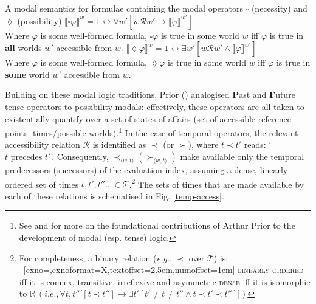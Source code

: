 \documentclass[11pt,dvipsnames]{report}
\providecommand{\denote}[2][]{\ensuremath{\llbracket{#2}\rrbracket^{#1}}}
\begin{document}
\pex A modal semantics for formulae containing the modal operators $ \square $ (necessity) and $ \lozenge $ (possibility)  
\a$ \denote[w]{\square\varphi} =1\leftrightarrow\forall w'[w\mathcal{R} w'\to\denote[w']{\varphi}] $\\
Where $ \varphi $ is some well-formed formula, $ \square\varphi $ is true in some world $ w $ iff $ \varphi $ is true in \textbf{all} worlds $ w' $ accessible from $ w $.
\a$  \denote[w]{\lozenge\varphi} =1\leftrightarrow\exists w'[w\mathcal{R} w'\wedge\denote[w']{\varphi}] $\\
Where $ \varphi $ is some well-formed formula, $ \lozenge\varphi $ is true in some world $ w $ iff $ \varphi $ is true in \textbf{some} world $ w' $ accessible from $ w $.
\xe


\noindent Building on these modal logic traditions, Prior (\citeyear{Prior1958,Prior1967,Prior1957}) analogised \textbf{P}ast and \textbf{F}uture tense operators to possibility modals: effectively, these operators are all taken to existentially quantify over a set of states-of-affairs (set of accessible reference points: times/possible worlds).\footnote{See \citet{Copeland2002,Copeland2020} and \citet{Markoska-Cubrinovska2016} for more on the foundational contributions of Arthur Prior to the development of modal (esp. tense) logic.} In the case of temporal operators, the relevant accessibility relation $ \mathcal R $ is identified as $ \prec $ (or $ \succ $), where $ t\prec t' $ reads: `$ t \text{ precedes }t' $'. Consequently, $ \prec_{\langle w,t\rangle} (\succ_{\langle w,t\rangle}) $ make available only the temporal predecessors (successors) of the evaluation index, assuming a dense, linearly-ordered set of times $ t,t',t''\hdots\in\mathcal T $.\footnote{
	For completeness, a binary relation (\textit{e.g.}, $ \prec $ over $ \mathcal T $) is:
\pex~[exno=,exnoformat=X,textoffset=2.5em,numoffset=1em] 
\a  \textsc{linearly ordered} iff it is connex, transitive, irreflexive and asymmetric
\a \textsc{dense} iff it is isomorphic to $ \mathbb R\: (\textit{i.e.}, \forall t,t''\big[[t\prec t'']\to\exists t'[t'\neq t\neq t''\wedge t\prec t'\prec t'']\big] )$
\xe	
	} 
The sets of times that are made available by each of these relations is schematised in Fig. \ref{temp-access}. 
\end{document}
